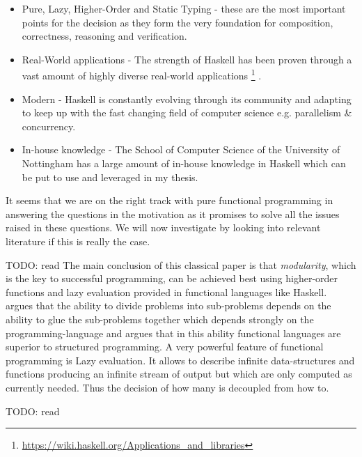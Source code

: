 \begin{itemize}
	\item Pure, Lazy, Higher-Order and Static Typing - these are the most important points for the decision as they form the very foundation for composition, correctness, reasoning and verification. 
	\item Real-World applications - The strength of Haskell has been proven through a vast amount of highly diverse real-world applications \footnote{\url{https://wiki.haskell.org/Applications_and_libraries}} \cite{hudak_history_2007}.
	\item Modern - Haskell is constantly evolving through its community and adapting to keep up with the fast changing field of computer science e.g. parallelism \& concurrency.
	\item In-house knowledge - The School of Computer Science of the University of Nottingham has a large amount of in-house knowledge in Haskell which can be put to use and leveraged in my thesis.
\end{itemize}

It seems that we are on the right track with pure functional programming in answering the questions in the motivation as it promises to solve all the issues raised in these questions. We will now investigate by looking into relevant literature if this is really the case. 

TODO: read \cite{hughes_why_1989}
The main conclusion of this classical paper is that \textit{modularity}, which is the key to successful programming, can be achieved best using higher-order functions and lazy evaluation provided in functional languages like Haskell. \cite{hughes_why_1989} argues that the ability to divide problems into sub-problems depends on the ability to glue the sub-problems together which depends strongly on the programming-language and \cite{hughes_why_1989} argues that in this ability functional languages are superior to structured programming.
A very powerful feature of functional programming is Lazy evaluation. It allows to describe infinite data-structures and functions producing an infinite stream of output but which are only computed as currently needed. Thus the decision of how many is decoupled from how to.

TODO: read \cite{wadler_essence_1992}

